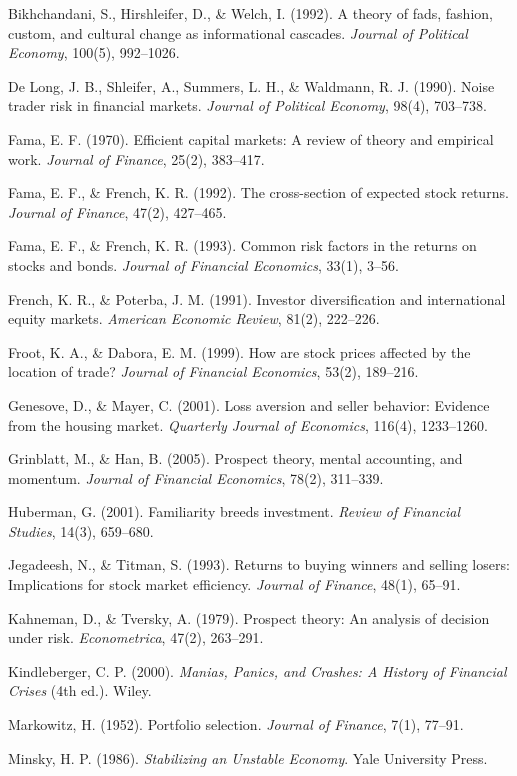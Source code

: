 \documentclass[12pt, letterpaper]{article}
\begin{document}
Bikhchandani, S., Hirshleifer, D., \& Welch, I. (1992). A theory of fads, fashion, custom, and cultural change as informational cascades. \textit{Journal of Political Economy}, 100(5), 992--1026.

De Long, J. B., Shleifer, A., Summers, L. H., \& Waldmann, R. J. (1990). Noise trader risk in financial markets. \textit{Journal of Political Economy}, 98(4), 703--738.

Fama, E. F. (1970). Efficient capital markets: A review of theory and empirical work. \textit{Journal of Finance}, 25(2), 383--417.

Fama, E. F., \& French, K. R. (1992). The cross-section of expected stock returns. \textit{Journal of Finance}, 47(2), 427--465.

Fama, E. F., \& French, K. R. (1993). Common risk factors in the returns on stocks and bonds. \textit{Journal of Financial Economics}, 33(1), 3--56.

French, K. R., \& Poterba, J. M. (1991). Investor diversification and international equity markets. \textit{American Economic Review}, 81(2), 222--226.

Froot, K. A., \& Dabora, E. M. (1999). How are stock prices affected by the location of trade? \textit{Journal of Financial Economics}, 53(2), 189--216.

Genesove, D., \& Mayer, C. (2001). Loss aversion and seller behavior: Evidence from the housing market. \textit{Quarterly Journal of Economics}, 116(4), 1233--1260.

Grinblatt, M., \& Han, B. (2005). Prospect theory, mental accounting, and momentum. \textit{Journal of Financial Economics}, 78(2), 311--339.

Huberman, G. (2001). Familiarity breeds investment. \textit{Review of Financial Studies}, 14(3), 659--680.

Jegadeesh, N., \& Titman, S. (1993). Returns to buying winners and selling losers: Implications for stock market efficiency. \textit{Journal of Finance}, 48(1), 65--91.

Kahneman, D., \& Tversky, A. (1979). Prospect theory: An analysis of decision under risk. \textit{Econometrica}, 47(2), 263--291.

Kindleberger, C. P. (2000). \textit{Manias, Panics, and Crashes: A History of Financial Crises} (4th ed.). Wiley.

Markowitz, H. (1952). Portfolio selection. \textit{Journal of Finance}, 7(1), 77--91.

Minsky, H. P. (1986). \textit{Stabilizing an Unstable Economy}. Yale University Press.
\end{document}

